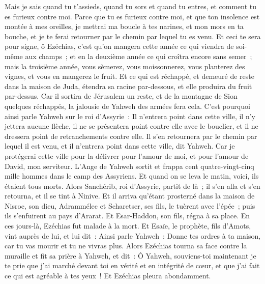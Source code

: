 \begin{multicols}{2}
Mais je sais quand tu t'assieds, quand tu sors et quand tu entres, et comment tu es furieux contre moi.
Parce que tu es furieux contre moi, et que ton insolence est montée à mes oreilles, je mettrai ma boucle à tes narines, et mon mors en ta bouche, et je te ferai retourner par le chemin par lequel tu es venu.
Et ceci te sera pour signe, ô Ezéchias, c'est qu'on mangera cette année ce qui viendra de soi-même aux champs~; et en la deuxième année ce qui croîtra encore sans semer~; mais la troisième année, vous sèmerez, vous moissonnerez, vous planterez des vignes, et vous en mangerez le fruit.
Et ce qui est réchappé, et demeuré de reste dans la maison de Juda, étendra sa racine par-dessous, et elle produira du fruit par-dessus.
Car il sortira de Jérusalem un reste, et de la montagne de Sion quelques réchappés, la jalousie de Yahweh des armées fera cela.
C'est pourquoi ainsi parle Yahweh sur le roi d'Assyrie~: Il n'entrera point dans cette ville, il n'y jettera aucune flèche, il ne se présentera point contre elle avec le bouclier, et il ne dressera point de retranchements contre elle.
Il s'en retournera par le chemin par lequel il est venu, et il n'entrera point dans cette ville, dit Yahweh.
Car je protégerai cette ville pour la délivrer pour l'amour de moi, et pour l'amour de David, mon serviteur.
L'Ange de Yahweh sortit et frappa cent quatre-vingt-cinq mille hommes dans le camp des Assyriens. Et quand on se leva le matin, voici, ils étaient tous morts.
Alors Sanchérib, roi d'Assyrie, partit de là~; il s'en alla et s'en retourna, et il se tint à Ninive.
Et il arriva qu'étant prosterné dans la maison de Nisroc, son dieu, Adrammélec et Scharetser, ses fils, le tuèrent avec l'épée~; puis ils s'enfuirent au pays d'Ararat. Et Esar-Haddon, son fils, régna à sa place.
\VerseOne{}En ces jours-là, Ezéchias fut malade à la mort. Et Esaïe, le prophète, fils d'Amots, vint auprès de lui, et lui dit~: Ainsi parle Yahweh~: Donne tes ordres à ta maison, car tu vas mourir et tu ne vivras plus.
Alors Ezéchias tourna sa face contre la muraille et fit sa prière à Yahweh,
et dit~: Ô Yahweh, souviens-toi maintenant je te prie que j'ai marché devant toi en vérité et en intégrité de cœur, et que j'ai fait ce qui est agréable à tes yeux~! Et Ezéchias pleura abondamment.

\end{multicols}
